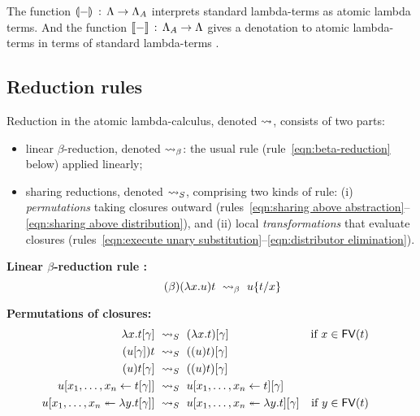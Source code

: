 \documentclass{llncs} %
\begin{document}
The function ${\llparenthesis{-}\rrparenthesis_{{}}}\,:\,\Lambda\to\Lambda_A$ interprets standard lambda-terms as atomic lambda terms.
%
And the function ${\llbracket{-}\rrbracket}\,:\,\Lambda_A\to\Lambda$ gives a denotation to atomic lambda-terms in terms of standard lambda-terms \cite{Gundersen-Heijltjes-Parigot-2013-LICS}.


\subsection{Reduction rules}


Reduction in the atomic lambda-calculus, denoted $\rewrite$, consists of two parts:
\begin{itemize}
 \item linear $\beta$-reduction, denoted $\ALbeta$: the usual rule (rule~\ref{eqn:beta-reduction} below) applied linearly;
 \item sharing reductions, denoted $\ALnotbeta$, comprising two kinds of rule: (i) \emph{permutations} taking closures outward (rules~\ref{eqn:sharing above abstraction}--\ref{eqn:sharing above distribution}), and (ii) local \emph{transformations} that evaluate closures (rules~\ref{eqn:execute unary substitution}--\ref{eqn:distributor elimination}).
\end{itemize}


\noindent
{\bf Linear  $\beta$-reduction rule :}
%
\begin{equation}\tag{$\beta$}\label{eqn:beta-reduction}
	(\lambda x.u)t ~\ALbeta~ u\sub xt
\end{equation}


\noindent
{\bf Permutations of closures:}
%
\begin{align}\label{eqn:sharing above abstraction}
	\lambda x.t\g & ~\ALnotbeta~ (\lambda x.t)\g
		 & \text{if}~x\in\FV(t) &&&
\\\label{eqn:sharing above application function}
	(u\g)t & ~\ALnotbeta~ ((u)t)\g
\\\label{eqn:sharing above application argument}
	(u)t\g & ~\ALnotbeta~ ((u)t)\g
\\\label{eqn:sharing above sharing}
	u\share x{t\g} & ~\ALnotbeta~ u\share xt\g
\\\label{eqn:sharing above distribution}
	u\distr xy{t\g} & ~\ALnotbeta~ u\distr xyt\g
		& \text{if}~y\in\FV(t) &&&
\end{align}
\end{document}
